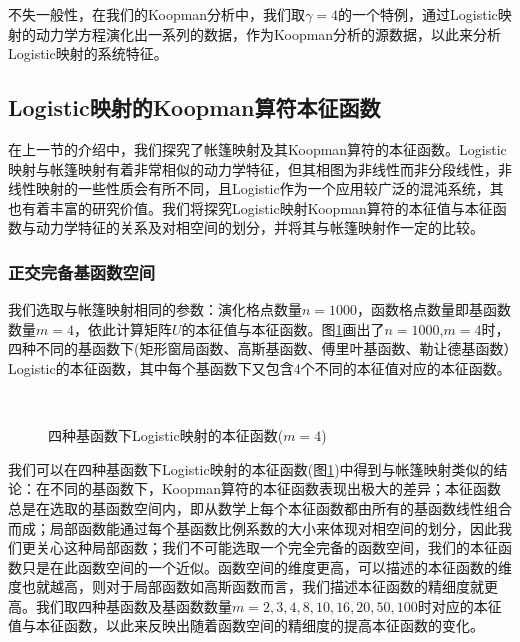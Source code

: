 不失一般性，在我们的Koopman分析中，我们取$\gamma=4$的一个特例，通过Logistic映射的动力学方程演化出一系列的数据，作为Koopman分析的源数据，以此来分析Logistic映射的系统特征。


\subsection{Logistic映射的Koopman算符本征函数}
在上一节的介绍中，我们探究了帐篷映射及其Koopman算符的本征函数。Logistic映射与帐篷映射有着非常相似的动力学特征，但其相图为非线性而非分段线性，非线性映射的一些性质会有所不同，且Logistic作为一个应用较广泛的混沌系统，其也有着丰富的研究价值。我们将探究Logistic映射Koopman算符的本征值与本征函数与动力学特征的关系及对相空间的划分，并将其与帐篷映射作一定的比较。


\subsubsection{正交完备基函数空间}

我们选取与帐篷映射相同的参数：演化格点数量$n=1000$，函数格点数量即基函数数量$m=4$，依此计算矩阵$U$的本征值与本征函数。图\ref{fig:logi_eig_RGFL}画出了$n=1000$,$m=4$时，四种不同的基函数下(矩形窗局函数、高斯基函数、傅里叶基函数、勒让德基函数）Logistic的本征函数，其中每个基函数下又包含4个不同的本征值对应的本征函数。

\begin{figure}[!]
    \centering
      \\
    \caption{四种基函数下Logistic映射的本征函数($m=4$)}\label{fig:logi_eig_RGFL}
\end{figure}

我们可以在四种基函数下Logistic映射的本征函数(图\ref{fig:logi_eig_RGFL})中得到与帐篷映射类似的结论：在不同的基函数下，Koopman算符的本征函数表现出极大的差异；本征函数总是在选取的基函数空间内，即从数学上每个本征函数都由所有的基函数线性组合而成；局部函数能通过每个基函数比例系数的大小来体现对相空间的划分，因此我们更关心这种局部函数；我们不可能选取一个完全完备的函数空间，我们的本征函数只是在此函数空间的一个近似。函数空间的维度更高，可以描述的本征函数的维度也就越高，则对于局部函数如高斯函数而言，我们描述本征函数的精细度就更高。我们取四种基函数及基函数数量$m=2,3,4,8,10,16,20,50,100$时对应的本征值与本征函数，以此来反映出随着函数空间的精细度的提高本征函数的变化。

